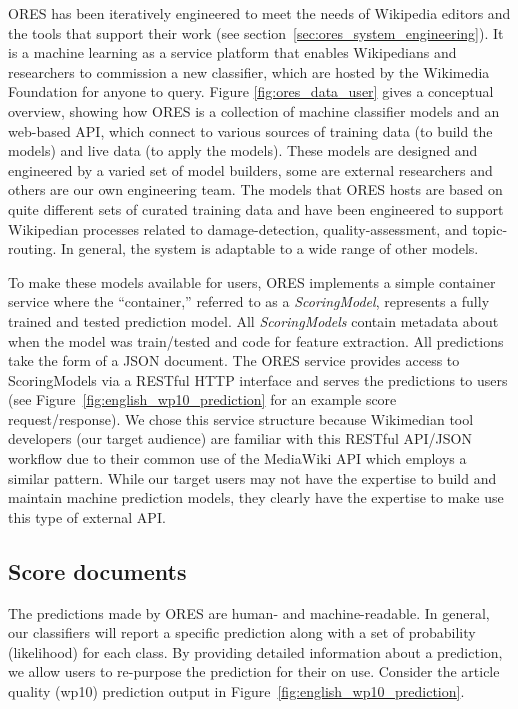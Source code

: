 
ORES has been iteratively engineered to meet the needs of Wikipedia editors and the tools that support their work (see section~\ref{sec:ores_system_engineering}). It is a machine learning as a service platform that enables Wikipedians and researchers to commission a new classifier, which are hosted by the Wikimedia Foundation for anyone to query. Figure  \ref{fig:ores_data_user} gives a conceptual overview, showing how ORES is a collection of machine classifier models and an web-based API, which connect to various sources of training data (to build the models) and live data (to apply the models). These models are designed and engineered by a varied set of model builders, some are external researchers and others are our own engineering team.  The models that ORES hosts are based on quite different sets of curated training data and have been engineered to support Wikipedian processes related to damage-detection, quality-assessment, and topic-routing. In general, the system is adaptable to a wide range of other models.

To make these models available for users, ORES implements a simple container service where the ``container,'' referred to as a \emph{ScoringModel}, represents a fully trained and tested prediction model.  All \emph{ScoringModels} contain metadata about when the model was train/tested and code for feature extraction.  All predictions take the form of a JSON document.  The ORES service provides access to ScoringModels via a RESTful HTTP interface and serves the predictions to users (see Figure~\ref{fig:english_wp10_prediction} for an example score request/response).  We chose this service structure because Wikimedian tool developers (our target audience) are familiar with this RESTful API/JSON workflow due to their common use of the MediaWiki API which employs a similar pattern.  While our target users may not have the expertise to build and maintain machine prediction models, they clearly have the expertise to make use this type of external API.

\subsection{Score documents}
\label{sec:appendix.score_documents}
The predictions made by ORES are human- and machine-readable.  In general, our classifiers will report a specific prediction along with a set of probability (likelihood) for each class.  By providing detailed information about a prediction, we allow users to re-purpose the prediction for their on use.  Consider the article quality (wp10) prediction output in Figure~\ref{fig:english_wp10_prediction}.

